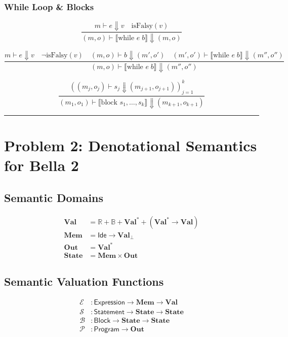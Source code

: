 \documentclass[11pt,a4paper]{article}
\begin{document}
\subsubsection*{While Loop \& Blocks}
\begin{equation*}
\frac{m \vdash e \Downarrow v \quad \text{isFalsy}(v)}{(m,o) \vdash \llbracket \text{while } e\;b \rrbracket \Downarrow (m,o)}
\end{equation*}

\begin{equation*}
\frac{m \vdash e \Downarrow v \quad \neg\text{isFalsy}(v) \quad (m,o) \vdash b \Downarrow (m',o') \quad (m',o') \vdash \llbracket \text{while } e\;b \rrbracket \Downarrow (m'',o'')}{(m,o) \vdash \llbracket \text{while } e\;b \rrbracket \Downarrow (m'',o'')}
\end{equation*}

\begin{equation*}
\frac{((m_j,o_j) \vdash s_j \Downarrow (m_{j+1},o_{j+1}))_{j=1}^k}{(m_1,o_1) \vdash \llbracket \text{block } s_1,\ldots,s_k \rrbracket \Downarrow (m_{k+1}, o_{k+1})}
\end{equation*}

\vspace{2em}
\hrule
\vspace{2em}

\section*{Problem 2: Denotational Semantics for Bella 2}

\subsection*{Semantic Domains}
\begin{align*}
\mathbf{Val} &= \mathbb{R} + \mathbb{B} + \mathbf{Val}^* + (\mathbf{Val}^* \to \mathbf{Val}) \\
\mathbf{Mem} &= \mathsf{Ide} \to \mathbf{Val}_\bot \\
\mathbf{Out} &= \mathbf{Val}^* \\
\mathbf{State} &= \mathbf{Mem} \times \mathbf{Out}
\end{align*}

\subsection*{Semantic Valuation Functions}
\begin{align*}
\mathcal{E} &: \mathsf{Expression} \to \mathbf{Mem} \to \mathbf{Val} \\
\mathcal{S} &: \mathsf{Statement} \to \mathbf{State} \to \mathbf{State} \\
\mathcal{B} &: \mathsf{Block} \to \mathbf{State} \to \mathbf{State} \\
\mathcal{P} &: \mathsf{Program} \to \mathbf{Out}
\end{align*}
\end{document}
